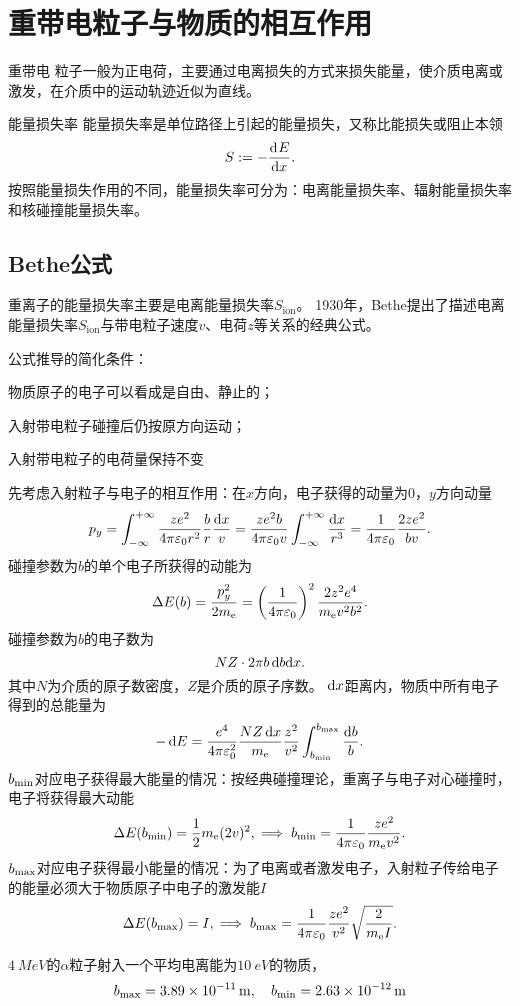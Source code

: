 \section{重带电粒子与物质的相互作用}

重带电 粒子一般为正电荷，主要通过电离损失的方式来损失能量，使介质电离或激发，在介质中的运动轨迹近似为直线。
\begin{definition}{能量损失率}{}
	能量损失率是单位路径上引起的能量损失，又称比能损失或阻止本领
	\begin{align}
		S:=-\frac{\mathrm{d}^{{}}E}{\mathrm{d}{x}^{{}}}.
	\end{align}
	按照能量损失作用的不同，能量损失率可分为：电离能量损失率、辐射能量损失率和核碰撞能量损失率。
\end{definition}

\subsection{Bethe公式}

重离子的能量损失率主要是电离能量损失率$S_{\mathrm{ion}}$。
1930年，Bethe提出了描述电离能量损失率$S_{\mathrm{ion}}$与带电粒子速度$v$、电荷$z$等关系的经典公式。

公式推导的简化条件：
\begin{compactenum}
	\item 物质原子的电子可以看成是自由、静止的；
	\item 入射带电粒子碰撞后仍按原方向运动；
	\item 入射带电粒子的电荷量保持不变
\end{compactenum}

先考虑入射粒子与电子的相互作用：在$x$方向，电子获得的动量为0，$y$方向动量 
\[
	p_y=\int_{-\infty}^{+\infty}\frac{ze^2}{4\pi\varepsilon_0r^2}\frac br\frac{\mathop{}\!\mathrm{d} x}v=\frac{ze^2b}{4\pi\varepsilon_0v}\int_{-\infty}^{+\infty}\frac{\mathop{}\!\mathrm{d} x}{r^3}=\frac1{4\pi\varepsilon_0}\frac{2ze^2}{bv}.
\]
碰撞参数为$b$的单个电子所获得的动能为
\[
	\Delta E(b)=\frac{p_y^2}{2m_\mathrm e}=\left(\frac1{4\pi\varepsilon_0}\right)^2\frac{2z^2e^4}{m_\mathrm e v^2b^2}.
\]
碰撞参数为$b$的电子数为
\[
	NZ\cdot 2\pi b\mathop{}\!\mathrm{d} b\mathrm{d} x.
\]
其中$N$为介质的原子数密度，$Z$是介质的原子序数。
\newpage
$\mathop{}\!\mathrm{d} x$距离内，物质中所有电子得到的总能量为
\[
	-\mathop{}\!\mathrm{d} E=\frac{e^4}{4\pi\varepsilon_0^2}\frac{NZ\mathop{}\!\mathrm{d} x}{m_\mathrm e}\frac{z^2}{v^2}\int_{b_\mathrm{min}}^{b_\mathrm{max}}\frac{\mathop{}\!\mathrm{d} b}b.
\]
$b_\mathrm{min}$对应电子获得最大能量的情况：按经典碰撞理论，重离子与电子对心碰撞时，电子将获得最大动能
\[
	\Delta E(b_\mathrm{min})=\frac12m_\mathrm e(2v)^2,\implies b_\mathrm{min}=\frac1{4\pi\varepsilon_0}\frac{ze^2}{m_\mathrm e v^2}.
\]
$b_\mathrm{max}$对应电子获得最小能量的情况：为了电离或者激发电子，入射粒子传给电子的能量必须大于物质原子中电子的激发能$I$
\[
	\Delta E(b_\mathrm{max})=I,\implies b_\mathrm{max}=\frac1{4\pi\varepsilon_0}\frac{ze^2}{v^2}\sqrt{\frac2{m_\mathrm e I}}.
\]
\begin{example}{}{}
	$\SI{4}{MeV}$的$\alpha$粒子射入一个平均电离能为$\SI{10}{eV}$的物质，
	\[
		b_\mathrm{max}=\SI{3.89e-11}{m},\quad b_\mathrm{min}=\SI{2.63e-12}{m}
	\]
\end{example}

